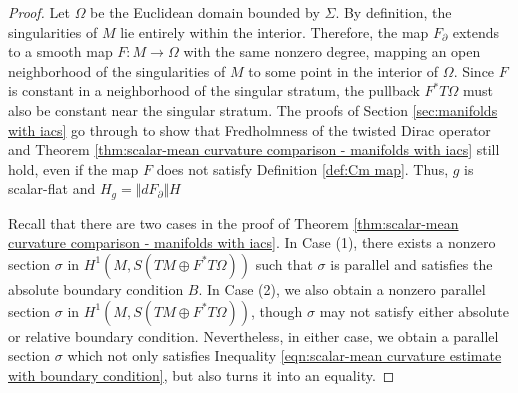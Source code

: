 \documentclass[12pt, reqno]{amsart}
\theoremstyle{plain} %
\theoremstyle{definition}
\theoremstyle{remark}
\numberwithin{equation}{section}
\newcommand{\onorm}[1]{\Vert #1 \Vert}
\begin{document}
\begin{proof}
    Let $\Omega$ be the Euclidean domain bounded by $\Sigma$.
    By definition, the singularities of \(M\) lie entirely within the interior.
    Therefore, the map \(F_\partial\) extends to a smooth map \(F\colon M\to\Omega\) with the same nonzero degree, mapping an open neighborhood of the singularities of \(M\) to some point in the interior of \(\Omega\).
    Since \(F\) is constant in a neighborhood of the singular stratum, the pullback \(F^*T\Omega\) must also be constant near the singular stratum.
    The proofs of Section \ref{sec:manifolds with iacs} go through to show that Fredholmness of the twisted Dirac operator and Theorem \ref{thm:scalar-mean curvature comparison - manifolds with iacs} still hold, even if the map \(F\) does not satisfy Definition \ref{def:Cm map}.
    Thus, $g$ is scalar-flat and \(H_g = \onorm{dF_\partial}H\)

    Recall that there are two cases in the proof of Theorem \ref{thm:scalar-mean curvature comparison - manifolds with iacs}. In Case (1), there exists a nonzero section \(\sigma\) in \(H^1(M,S(TM\oplus F^*T\Omega))\) such that \(\sigma\) is parallel and satisfies the absolute boundary condition \(B\). 
    In Case (2), we also obtain a nonzero parallel section $\sigma$ in \(H^1(M,S(TM\oplus F^*T\Omega))\), though $\sigma$ may not satisfy either absolute or relative boundary condition.
    Nevertheless, in either case, we obtain a parallel section \(\sigma\) which not only satisfies Inequality \eqref{eqn:scalar-mean curvature estimate with boundary condition}, but also turns it into an equality.
    

\end{proof}
\end{document}
